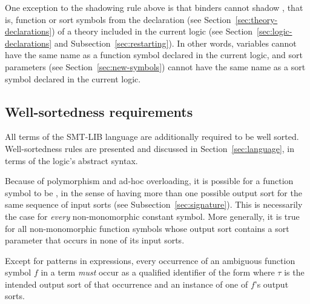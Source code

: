 \begin{remark}
One exception to the shadowing rule above is that binders cannot shadow ,
that is, function or sort symbols from the declaration 
(see Section~\ref{sec:theory-declarations})
of a theory included in the current logic
(see Section~\ref{sec:logic-declarations} and Subsection~\ref{sec:restarting}).
In other words, variables cannot have the same name 
as a function symbol declared in the current logic, and sort parameters
(see Section~\ref{sec:new-symbols})
cannot have the same name as a sort symbol declared in the current logic.
\end{remark}

\subsection{Well-sortedness requirements} \label{well-sortedness}

All terms of the SMT-LIB language are additionally required to be well sorted.
Well-sortedness rules are presented and discussed in Section~\ref{sec:language},
in terms of the logic's abstract syntax.

Because of polymorphism and ad-hoc overloading, it is possible 
for a function symbol to be , in the sense of
having more than one possible output sort 
for the same sequence of input sorts (see Subsection~\ref{sec:signature}).
This is necessarily the case for \emph{every} non-monomorphic constant symbol.
More generally, it is true for all non-monomorphic function symbols
whose output sort contains a sort parameter that occurs in none of its input sorts.

Except for patterns in  expressions,
every occurrence of an ambiguous function symbol
$f$ in a term \emph{must} occur as a qualified identifier of the form
 where $\tau$ is the intended output sort
of that occurrence and an instance of one of $f$'s output sorts.

